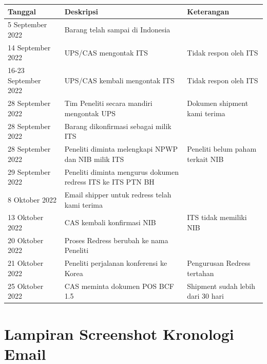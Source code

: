 \documentclass{article} %
\begin{document}
	\begin{table}[!ht]
		\begin{tabular}{|l|l|l|}
		\hline	
		\textbf{Tanggal}	& \textbf{Deskripsi} & \textbf{Keterangan}  \\ \hline
		5 September 2022	& Barang telah sampai di Indonesia &  \\ \hline
		14 September 2022	& UPS/CAS mengontak ITS & Tidak respon oleh ITS \\ \hline
		16-23 September 2022	& UPS/CAS kembali mengontak ITS & Tidak respon oleh ITS \\ \hline
		28 September 2022	& Tim Peneliti secara mandiri mengontak UPS & Dokumen shipment kami terima \\ \hline
		28 September 2022	& Barang dikonfirmasi sebagai milik ITS &  \\ \hline
		28 September 2022	& Peneliti diminta melengkapi NPWP dan NIB milik ITS & Peneliti belum paham terkait NIB  \\ \hline
		29 September 2022	& Peneliti diminta mengurus dokumen redress ITS ke ITS PTN BH &  \\ \hline
		8 Oktober 2022	& Email shipper untuk redress telah kami terima &  \\ \hline
		13 Oktober 2022	& CAS kembali konfirmasi NIB &  ITS tidak memiliki NIB \\ \hline
		20 Oktober 2022 & Proses Redress berubah ke nama Peneliti &  \\ \hline
		21 Oktober 2022 & Peneliti perjalanan konferensi ke Korea & Pengurusan Redress tertahan  \\ \hline
		25 Oktober 2022 & CAS meminta dokumen POS BCF 1.5 & Shipment sudah lebih dari 30 hari   \\ \hline
		\end{tabular}
	\end{table}

	\newpage
	\section{Lampiran Screenshot Kronologi Email}
	
\end{document}
